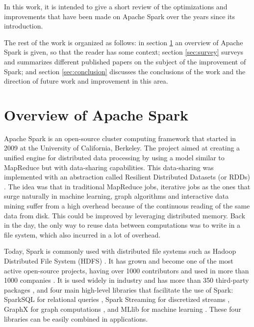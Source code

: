 \documentclass{article}
\begin{document}
In this work, it is intended to give a short review of the optimizations and improvements that have been made on Apache Spark over the years since its introduction. 

The rest of the work is organized as follows: in section \ref{sec:spark_overview} an overview of Apache Spark is given, so that the reader has some context; section \ref{sec:survey} surveys and summarizes different published papers on the subject of the improvement of Spark; and section \ref{sec:conclusion} discusses the conclusions of the work and the direction of future work and improvement in this area.


\section{Overview of Apache Spark}
\label{sec:spark_overview}

Apache Spark \cite{zaharia_spark:_2010} is an open-source cluster computing framework that started in 2009 at the University of California, Berkeley. The project aimed at creating a unified engine for distributed data processing by using a model similar to MapReduce but with data-sharing capabilities. This data-sharing was implemented with an abstraction called Resilient Distributed Datasets (or RDDs) \cite{zaharia_resilient_2012}. The idea was that in traditional MapReduce jobs, iterative jobs as the ones that surge naturally in machine learning, graph algorithms and interactive data mining suffer from a high overhead because of the continuous reading of the same data from disk. This could be improved by leveraging distributed memory. Back in the day, the only way to reuse data between computations was to write in a file system, which also incurred in a lot of overhead. 

Today, Spark is commonly used with distributed file systems such as Hadoop Distributed File System (HDFS) \cite{Shvachko2010}. It has grown and become one of the most active open-source projects, having over 1000 contributors and used in more than 1000 companies \cite{zaharia_apache_2016}. It is used widely in industry and has more than 350 third-party packages \cite{SparkPackages}, and four main high-level libraries that facilitate the use of Spark: SparkSQL for relational queries \cite{armbrust2015spark}, Spark Streaming for discretized streams \cite{zaharia2013discretized}, GraphX for graph computations \cite{gonzalez2014graphx}, and MLlib for machine learning \cite{Meng2016}. These four libraries can be easily combined in applications.
\end{document}
